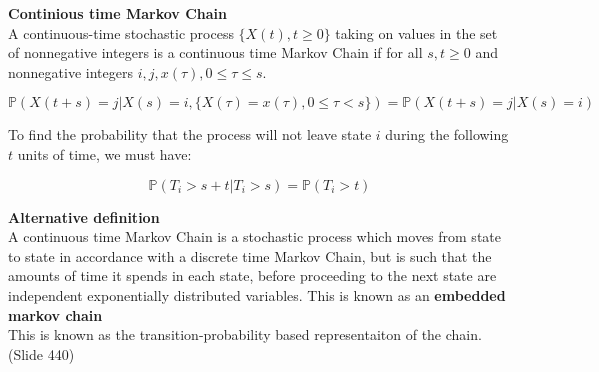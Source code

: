 \textbf{Continious time Markov Chain}\\

A continuous-time stochastic process $\{ X(t), t \geq 0 \}$ taking on values in the set of nonnegative integers is a continuous time Markov Chain if for all $s,t \geq 0$ and nonnegative integers $i, j, x(\tau), 0 \leq \tau \leq s$.

$$\mathbb{P}(X(t+s) = j|X(s) = i, \{X(\tau) = x(\tau), 0 \leq \tau < s \}) = \mathbb{P}(X(t+s)=j|X(s)=i)$$

To find the probability that the process will not leave state $i$ during the following $t$ units of time, we must have:

$$\mathbb{P}(T_i > s + t| T_i >s) = \mathbb{P}(T_i > t)$$

\textbf{Alternative definition}\\
A continuous time Markov Chain is a stochastic process which moves from state to state in accordance with a discrete time Markov Chain, but is such that the amounts of time it spends in each state, before proceeding to the next state are independent exponentially distributed variables. This is known as an \textbf{embedded markov chain}\\

This is known as the transition-probability based representaiton of the chain.\\

(Slide 440)
